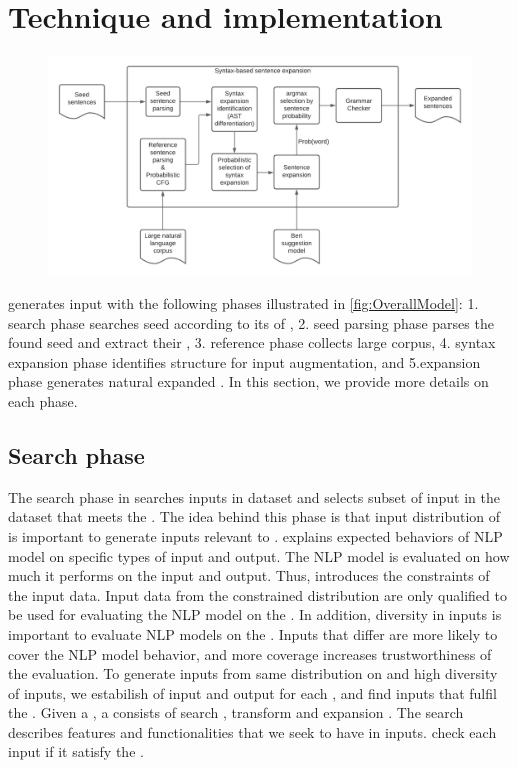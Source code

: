 \section{Technique and implementation}

\begin{figure}
  \centering
  \includegraphics[scale=0.5]{figs/overall.pdf}
  \vspace{-5pt}
  \caption{\OverallModelFigCaption}
  \vspace{-10pt}
\end{figure}

\Model generates input \sents with the following phases illustrated in
\ref{fig:OverallModel}: 1. search phase searches seed \sents according
to its \req of \lc, 2. seed parsing phase parses the found seed \sents
and extract their \cfg, 3. reference phase collects large corpus,
4. syntax expansion phase identifies structure for input augmentation,
and 5.\sent expansion phase generates natural expanded \sent. In this
section, we provide more details on each phase.

\subsection{Search phase}
The search phase in \Model searches inputs in dataset and selects
subset of input \sents in the dataset that meets the \lc
\req. The idea behind this phase is that input distribution of
\lc is important to generate inputs relevant to \lc. \Lc explains
expected behaviors of NLP model on specific types of input and
output. The NLP model is evaluated on how much it performs on the
input and output. Thus, \lc introduces the constraints of the input
data. Input data from the constrained distribution are only qualified
to be used for evaluating the NLP model on the \lc.  In addition,
diversity in inputs is important to evaluate NLP models on the
\lc. Inputs that differ are more likely to cover the NLP model
behavior, and more coverage increases trustworthiness of the
evaluation. To generate inputs from same distribution on \lc and high
diversity of inputs, we estabilish \reqs of input and output
for each \lc, and find inputs that fulfil the \reqs. Given a
\lc, a \req consists of search \req, transform
\req and expansion \req. The search \req
describes features and functionalities that we seek to have in
inputs. \Model check each input if it satisfy the \req.

